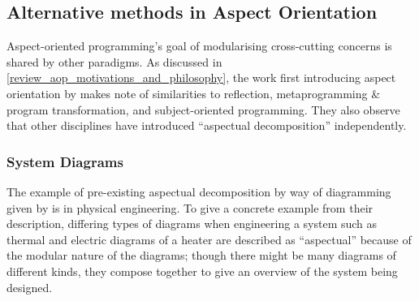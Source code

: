 \subsection{Alternative methods in Aspect Orientation}

Aspect-oriented programming's goal of modularising cross-cutting concerns is
shared by other paradigms. As discussed in
\cref{review_aop_motivations_and_philosophy}, the work first introducing aspect
orientation by \citet{kiczales1997aspect} makes note of similarities to
reflection, metaprogramming \& program transformation, and subject-oriented
programming. They also observe that other disciplines have introduced
``aspectual decomposition'' independently.


\subsubsection{System Diagrams}\label{subsec:system_diagrams_as_aspects}

The example of pre-existing aspectual decomposition by way of diagramming given
by \citet{kiczales1997aspect} is in physical engineering. To give a concrete
example from their description, differing types of diagrams when engineering a
system such as thermal and electric diagrams of a heater are described as
``aspectual'' because of the modular nature of the diagrams; though there might
be many diagrams of different kinds, they compose together to give an overview
of the system being designed.


